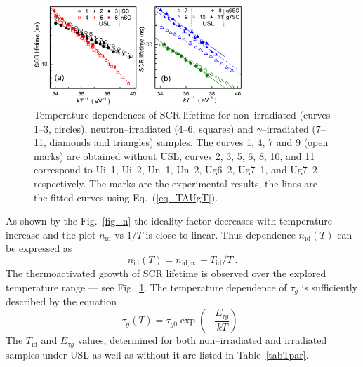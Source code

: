 \documentclass[aip,jap, amsmath,amssymb,reprint]{revtex4-1}
\begin{document}
\begin{figure}
\includegraphics[width=0.7\textwidth]{fig_4ab}%
\caption{\label{fig_TAUg}
Temperature dependences of SCR lifetime for non--irradiated (curves 1--3, circles),
neutron--irradiated (4--6, squares) and $\gamma$--irradiated (7--11, diamonds and triangles) samples.
The curves 1, 4, 7 and 9 (open marks) are obtained without USL,
curves 2, 3, 5, 6, 8, 10, and 11 correspond to
Ui--1, Ui--2, Un--1, Un--2, Ug6--2, Ug7--1, and Ug7--2 respectively.
The marks are the experimental results, the lines are the fitted curves using Eq.~(\ref{eq_TAUgT}).
}%
\end{figure}

As shown by the Fig.~\ref{fig_n} the ideality factor decreases with temperature increase and the plot $n_{\mathrm{id}}$ vs $1/T$  is close to linear.
Thus dependence $n_{\mathrm{id}}(T)$ can be expressed as
\begin{equation}
\label{eq_nT}
    n_{\mathrm{id}}(T)=n_{\mathrm{id},\infty}+T_{\mathrm{id}}/T\:.
\end{equation}
The thermoactivated growth of SCR lifetime is observed over the explored temperature range --- see Fig.~\ref{fig_TAUg}.
The temperature dependence of $\tau_{g}$ is sufficiently described by the equation
\begin{equation}
\label{eq_TAUgT}
    \tau_{g}(T)=\tau_{g0}\exp\left(-\frac{E_{\tau g}}{kT}\right)\:.
\end{equation}
The $T_{\mathrm{id}}$ and $E_{\tau g}$ values, determined for both non--irradiated and irradiated samples under USL as well as without it are listed in Table~\ref{tabTpar}.
\end{document}

